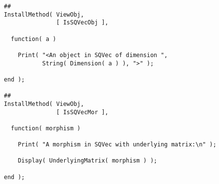 \begin{small}
\begin{Verbatim}[frame=single]
##
InstallMethod( ViewObj,
               [ IsSQVecObj ],

  function( a )

    Print( "<An object in SQVec of dimension ",
           String( Dimension( a ) ), ">" );

end );

##
InstallMethod( ViewObj,
               [ IsSQVecMor ],

  function( morphism )

    Print( "A morphism in SQVec with underlying matrix:\n" );
  
    Display( UnderlyingMatrix( morphism ) );

end );
\end{Verbatim}
\end{small}
